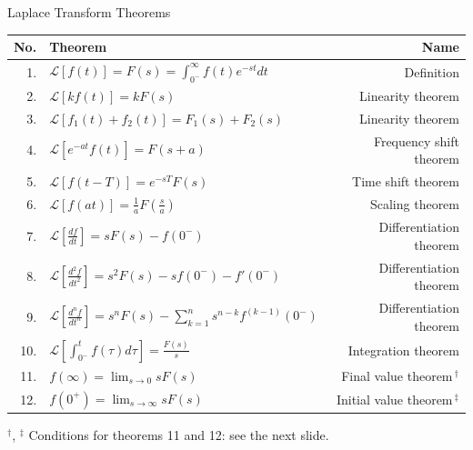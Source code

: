 \documentclass[12pt, aspectratio=169]{beamer}
\begin{document}
\begin{frame}{Laplace Transform Theorems}
    \begin{center}
        \scriptsize
        \setlength{\tabcolsep}{1.6em}
        \renewcommand{\arraystretch}{1.25}
        \begin{tabular}{@{}rlr@{}}
            \toprule
            No. & Theorem & Name \\
            \midrule
            1.  & $\mathcal{L}[f(t)] = F(s) = \displaystyle\int_{0^-}^{\infty}\! f(t)e^{-st}dt$ & Definition \\
            2.  & $\mathcal{L}[k f(t)] = k F(s)$                          & Linearity theorem \\
            3.  & $\mathcal{L}[f_1(t) + f_2(t)] = F_1(s) + F_2(s)$        & Linearity theorem \\
            4.  & $\mathcal{L}[e^{-at}f(t)] = F(s+a)$                     & Frequency shift theorem \\
            5.  & $\mathcal{L}[f(t-T)] = e^{-sT}F(s)$                     & Time shift theorem \\
            6.  & $\mathcal{L}[f(at)] = \frac{1}{a}F\!\left(\frac{s}{a}\right)$ & Scaling theorem \\
            7.  & $\mathcal{L}\!\left[\frac{df}{dt}\right] = sF(s) - f(0^-)$ & Differentiation theorem \\
            8.  & $\mathcal{L}\!\left[\frac{d^2f}{dt^2}\right] = s^2F(s) - sf(0^-) - f'(0^-)$ & Differentiation theorem \\
            9.  & $\mathcal{L}\!\left[\frac{d^nf}{dt^n}\right] = s^nF(s) - \sum_{k=1}^{n} s^{n-k}f^{(k-1)}(0^-)$ & Differentiation theorem \\
            10. & $\mathcal{L}\!\left[\int_{0^-}^{t}\! f(\tau)d\tau\right] = \frac{F(s)}{s}$ & Integration theorem \\
            11. & $f(\infty) = \lim_{s \to 0} sF(s)$                      & Final value theorem\,$^\dagger$ \\
            12. & $f(0^+) = \lim_{s \to \infty} sF(s)$                    & Initial value theorem\,$^\ddagger$ \\
            \bottomrule
        \end{tabular}
    \end{center}
    \vspace{0.1em}
    {\scriptsize $^\dagger$, $^\ddagger$ Conditions for theorems 11 and 12: see the next slide.}
\end{frame}
\end{document}

